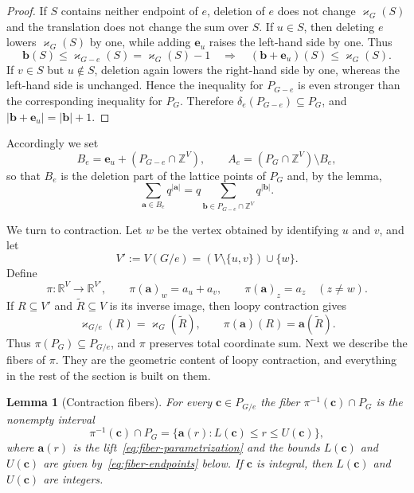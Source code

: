\documentclass[11pt]{article}
\theoremstyle{plain}
\newtheorem{lemma}[theorem]{Lemma}
\theoremstyle{definition}
\newcommand{\ba}{\mathbf{a}}
\newcommand{\bb}{\mathbf{b}}
\newcommand{\bc}{\mathbf{c}}
\newcommand{\be}{\mathbf{e}}
\newcommand{\kp}{\varkappa}
\newcommand{\ZZ}{\mathbb Z}
\newcommand{\RR}{\mathbb R}
\numberwithin{equation}{section}
\begin{document}
\begin{proof}
If $S$ contains neither endpoint of $e$, deletion of $e$ does not change
$\kp_G(S)$ and the translation does not change the sum over $S$.  If $u\in S$,
then deleting $e$ lowers $\kp_G(S)$ by one, while adding $\be_u$
raises the left-hand side by one.  Thus
\[
 \bb(S)\le\kp_{G-e}(S)=\kp_G(S)-1
 \quad\Longrightarrow\quad
 (\bb+\be_u)(S)\le\kp_G(S).
\]
If $v\in S$ but $u\notin S$, deletion again lowers the right-hand side by one,
whereas the left-hand side is unchanged.  Hence the inequality for $P_{G-e}$
is even stronger than the corresponding inequality for $P_G$.  Therefore
$\delta_e(P_{G-e})\subseteq P_G$, and $|\bb+\be_u|=|\bb|+1$.
\end{proof}

Accordingly we set
\begin{equation}
 B_e=\be_u+(P_{G-e}\cap\ZZ^V),
 \qquad
 A_e=(P_G\cap\ZZ^V)\setminus B_e,
\label{eq:deletion-lattice-piece}
\end{equation}
so that $B_e$ is the deletion part of the lattice points of $P_G$ and, by the
lemma,
\begin{equation}
   \sum_{\ba\in B_e}q^{|\ba|}
      =q\sum_{\bb\in P_{G-e}\cap\ZZ^V}q^{|\bb|}.
\label{eq:deletion-enumerator}
\end{equation}

We turn to contraction.
Let $w$ be the vertex obtained by identifying $u$ and $v$, and let
\[
  V':=V(G/e)=(V\setminus\{u,v\})\cup\{w\}.
\]
Define
\begin{equation}
   \pi:\RR^V\longrightarrow\RR^{V'},
   \qquad
   \pi(\ba)_w=a_u+a_v,
   \qquad
   \pi(\ba)_z=a_z\quad(z\ne w).
\label{eq:contraction-projection}
\end{equation}
If $R\subseteq V'$ and $\widetilde R\subseteq V$ is its inverse image, then
loopy contraction gives
\[
   \kp_{G/e}(R)=\kp_G(\widetilde R),
   \qquad
   \pi(\ba)(R)=\ba(\widetilde R).
\]
Thus $\pi(P_G)\subseteq P_{G/e}$, and $\pi$ preserves total coordinate sum.
Next we describe the fibers of $\pi$.
 They are the geometric content of
loopy contraction, and everything in the rest of the section is built on them.

\begin{lemma}[Contraction fibers]\label{lem:contraction-fibers}
  For every $\bc\in P_{G/e}$ the fiber
  $\pi^{-1}(\bc)\cap P_G$ is the nonempty interval
\begin{equation}
   \pi^{-1}(\bc)\cap P_G
   =\{\ba(r):L(\bc)\le r\le U(\bc)\},
\label{eq:contraction-fiber}
\end{equation}
where $\ba(r)$ is the lift~\eqref{eq:fiber-parametrization} and the bounds $L(\bc)$ and $U(\bc)$ are given
by~\eqref{eq:fiber-endpoints} below.  If $\bc$ is integral, then $L(\bc)$ and $U(\bc)$ are integers.
\end{lemma}
\end{document}
